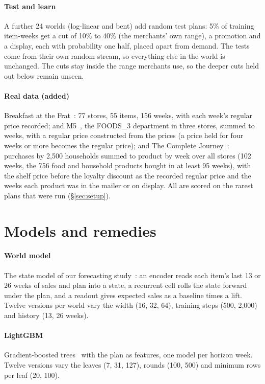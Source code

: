 \paragraph{Test and learn} A further 24 worlds (log-linear and bent) add random test plans: 5\% of training item-weeks get a cut of 10\%
to 40\% (the merchants' own range), a promotion and a display, each with probability one half, placed apart from
demand. The tests come from their own random stream, so everything else in the world is unchanged. The cuts stay
inside the range merchants use, so the deeper cuts held out below remain unseen.

\paragraph{Real data (added)} Breakfast at the Frat~\cite{frat}: 77 stores, 55 items, 156 weeks, with each week's
regular price recorded; and M5~\cite{m5accuracy}, the FOODS\_3 department in three stores, summed to weeks, with a
regular price constructed from the prices (a price held for four weeks or more becomes the regular price); and The
Complete Journey~\cite{completejourney}: purchases by 2,500 households summed to product by week over all stores
(102 weeks, the 756 food and household products bought in at least 95 weeks), with the shelf price before the
loyalty discount as the recorded regular price and the weeks each product was in the mailer or on display. All are
scored on the rarest plans that were run (\S\ref{sec:setup}).

\section{Models and remedies}\label{sec:method}

\paragraph{World model} The state model of our forecasting study~\cite{rwm}: an encoder reads each item's last 13
or 26 weeks of sales and plan into a state, a recurrent cell rolls the state forward under the plan, and a readout
gives expected sales as a baseline times a lift. Twelve versions per world vary the width (16, 32, 64), training
steps (500, 2{,}000) and history (13, 26 weeks).

\paragraph{LightGBM} Gradient-boosted trees~\cite{lightgbm} with the plan as features, one model per horizon week.
Twelve versions vary the leaves (7, 31, 127), rounds (100, 500) and minimum rows per leaf (20, 100).

